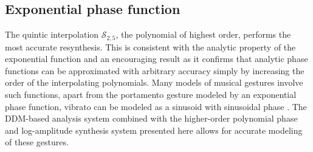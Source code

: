 \subsection{Exponential phase function}

The quintic interpolation $\mathscr{S}_{2,5}$, the polynomial of highest order,
performs the most accurate resynthesis. This is consistent with the analytic
property of the exponential function and an encouraging result as it confirms
that analytic phase functions can be approximated with arbitrary accuracy simply
by increasing the order of the interpolating polynomials. Many models of musical
gestures involve such functions, apart from the portamento gesture modeled by an
exponential phase function, vibrato can be modeled as a sinusoid with sinusoidal
phase \cite{maher1990investigation}. The DDM-based analysis system combined with
the higher-order polynomial phase and log-amplitude synthesis system presented
here allows for accurate modeling of these gestures.
